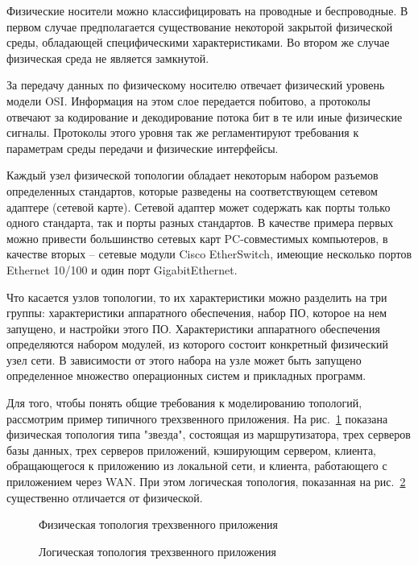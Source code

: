 Физические носители можно классифицировать на проводные и беспроводные. В первом случае
предполагается существование некоторой закрытой физической среды, обладающей
специфическими характеристиками. Во втором же случае физическая среда не является замкнутой.

За передачу данных по физическому носителю отвечает физический уровень модели OSI.
Информация на этом слое передается побитово, а протоколы отвечают за кодирование и
декодирование потока бит в те или иные физические сигналы. Протоколы этого уровня 
так же регламентируют требования к параметрам среды передачи и физические интерфейсы.

Каждый узел физической топологии обладает некоторым набором разъемов определенных
стандартов, которые разведены на соответствующем сетевом адаптере (сетевой карте).
Сетевой адаптер может содержать как порты только одного стандарта, так и
порты разных стандартов. В качестве примера первых можно привести большинство сетевых карт 
PC-совместимых  компьютеров, в качестве вторых -- сетевые модули Cisco EtherSwitch, имеющие 
несколько портов Ethernet 10/100 и один порт GigabitEthernet.\cite{cisco-etherswitch}

Что касается узлов топологии, то их характеристики можно разделить на три группы: 
характеристики аппаратного обеспечения, 
набор ПО, которое на нем запущено, 
и настройки этого ПО.
Характеристики аппаратного обеспечения определяются набором модулей, из которого
состоит конкретный физический узел сети. В зависимости от этого набора на узле
может быть запущено определенное множество операционных систем и прикладных программ.

Для того, чтобы понять общие требования к моделированию топологий, рассмотрим
пример типичного трехзвенного приложения.
На рис.~\ref{fig:physical-topology-ex} показана физическая топология типа "звезда", состоящая
из маршрутизатора, 
трех серверов базы данных, 
трех серверов приложений, 
кэширующим сервером, 
клиента, обращающегося к приложению из локальной сети, 
и клиента, работающего с  приложением через WAN.
При этом логическая топология, показанная на рис.~\ref{fig:logical-topology-ex} существенно отличается от физической.

\begin{figure}
  \centering
  {\small}
  \caption{Физическая топология трехзвенного приложения}
  \label{fig:physical-topology-ex}
\end{figure} 

\begin{figure}
  \centering
  {\small}
  \caption{Логическая топология трехзвенного приложения}
  \label{fig:logical-topology-ex}
\end{figure} 

